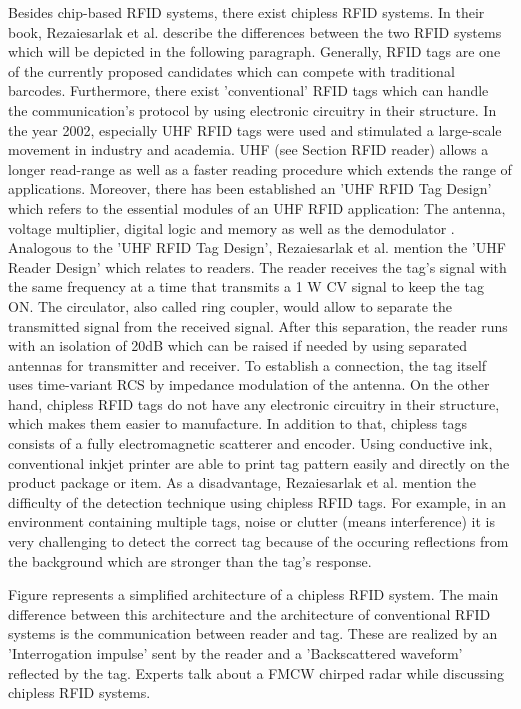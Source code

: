 Besides chip-based RFID systems, there exist chipless RFID systems. In their book, Rezaiesarlak et al. \cite{chipless} describe the differences between the two RFID systems which will be depicted in the following paragraph.
Generally, RFID tags are one of the currently proposed candidates which can compete with traditional barcodes. Furthermore, there exist 'conventional' RFID tags which can handle the communication's protocol by using electronic circuitry in their structure. In the year 2002, especially UHF RFID tags were used and stimulated a large-scale movement in industry and academia. UHF (see Section RFID reader\pageref{reader}) allows a longer read-range as well as a faster reading procedure which extends the range of applications. Moreover, there has been established an 'UHF RFID Tag Design' which refers to the essential modules of an UHF RFID application: The antenna, voltage multiplier, digital logic and memory as well as the demodulator \cite[p.12 ff.]{chipless}. Analogous to the 'UHF RFID Tag Design',  Rezaiesarlak et al. mention the 'UHF Reader Design' which relates to readers. The reader receives the tag's signal with the same frequency at a time that transmits a 1 W \ac{CV} signal to keep the tag ON. The circulator, also called ring coupler, would allow to separate the transmitted signal from the received signal. After this separation, the reader runs with an isolation of 20dB which can be raised if needed by using separated antennas for transmitter and receiver. To establish a connection, the tag itself uses time-variant \ac{RCS} by impedance modulation of the antenna. 
On the other hand, chipless RFID tags do not have any electronic circuitry in their structure, which makes them easier to manufacture. In addition to that, chipless tags consists of a fully electromagnetic scatterer and encoder. Using conductive ink, conventional inkjet printer are able to print tag pattern easily and directly on the product package or item. As a disadvantage, Rezaiesarlak et al. \cite[p.12 ff.]{chipless} mention the difficulty of the detection technique using chipless RFID tags. For example, in an environment containing multiple tags, noise or clutter (means interference) it is very challenging to detect the correct tag because of the occuring reflections from the background which are stronger than the tag's response. 

Figure \pageref{fig:chipless_architecture} represents a simplified architecture of a chipless RFID system. The main difference between this architecture and the architecture of conventional RFID systems is the communication between reader and tag. These are realized by an 'Interrogation impulse' sent by the reader and a 'Backscattered waveform' reflected by the tag. Experts talk about a \ac{FMCW} chirped radar while discussing chipless RFID systems. 


